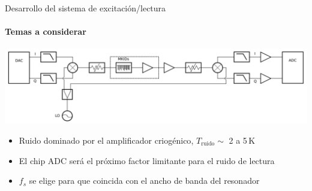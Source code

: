 \documentclass[ignorenonframetext,12pt]{beamer}
\begin{document}
		\begin{frame}{Desarrollo del sistema de excitación/lectura}
			\framesubtitle{Temas a considerar}
			\centering
			\includegraphics[width=\textwidth]{readout1}

			\begin{itemize}
				\item Ruido \alert{dominado por el amplificador criogénico},
					$T_\text{ruido} \sim$ 2 a 5\,K 
				\item \alert{El chip ADC será el próximo factor
					limitante para el ruido de lectura}
				\item	$f_s$ se elige para que
					coincida con el ancho de banda del resonador
			\end{itemize}

		\end{frame}

\end{document}
